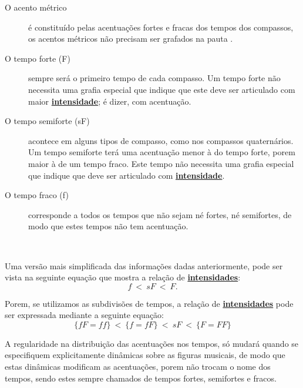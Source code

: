 \begin{description}
\item[O acento métrico] \label{def:acentometrico} é constituído pelas acentuações fortes e fracas dos tempos dos compassos, 
os acentos métricos não precisam ser grafados na pauta \cite[pp. 141]{medteoria}.
\item[O tempo forte (F)] \label{def:tempoforte} sempre será o primeiro tempo de cada compasso. 
Um tempo forte não necessita uma grafia especial que indique que este deve ser articulado
com maior \hyperref[sec:pos:Intensidade]{\textbf{intensidade}}; é dizer, com acentuação.
\item[O tempo semiforte (sF)] \label{def:temposemiforte} acontece em alguns tipos de compasso, 
como nos compassos quaternários. 
Um tempo semiforte terá uma acentuação menor à do tempo forte, porem maior à de um tempo fraco. 
Este tempo não necessita uma grafia especial que indique que deve ser articulado
com \hyperref[sec:pos:Intensidade]{\textbf{intensidade}}.
\item[O tempo fraco (f)] \label{def:tempofraco} corresponde a todos os tempos que não sejam né fortes, né semifortes,
de modo que estes tempos não tem acentuação. 
\end{description}~

Uma versão mais simplificada das informações dadas anteriormente, 
pode ser vista na seguinte equação que mostra a relação de \hyperref[sec:pos:Intensidade]{\textbf{intensidades}}:
\begin{equation}
f ~<~ sF ~<~ F.
\end{equation}

Porem, 
se utilizamos as subdivisões de tempos, 
a relação de \hyperref[sec:pos:Intensidade]{\textbf{intensidades}} pode ser expressada mediante a seguinte equação:
\begin{equation}
\{fF=ff\} ~<~  \{f = fF\} ~<~ sF ~<~ \{F = FF\} 
\end{equation}

\begin{remark}
A regularidade na distribuição das acentuações nos tempos, 
só mudará quando se especifiquem  explicitamente dinâmicas sobre as figuras musicais,
de modo que estas dinâmicas modificam as acentuações,
porem não trocam o nome dos tempos, sendo estes sempre chamados de tempos fortes, semifortes e fracos. 
\end{remark}


